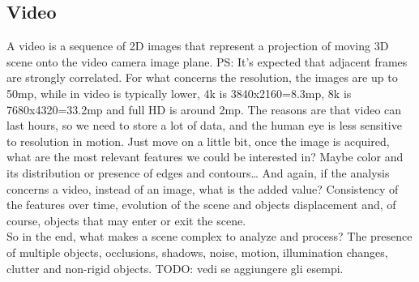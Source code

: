 \subsection{Video}
A video is a sequence of 2D images that represent a projection of moving 3D scene onto the video camera image plane. PS: It's expected that adjacent frames are strongly correlated.
For what concerns the resolution, the images are up to 50mp, while in video is typically lower, 4k is 3840x2160=8.3mp, 8k is 7680x4320=33.2mp and full HD is around 2mp.
The reasons are that video can last hours, so we need to store a lot of data, and the human eye is less sensitive to resolution in motion. 
Just move on a little bit, once the image is acquired, what are the most relevant features we could be interested in? Maybe color and its distribution or presence of edges and contours\dots
And again, if the analysis concerns a video, instead of an image, what is the added value?
Consistency of the features over time, evolution of the scene and objects displacement and, of course, objects that may enter or exit the scene.
\\So in the end, what makes a scene complex to analyze and process?
The presence of multiple objects, occlusions, shadows, noise, motion, illumination changes, clutter and non-rigid objects.
    TODO: vedi se aggiungere gli esempi.

